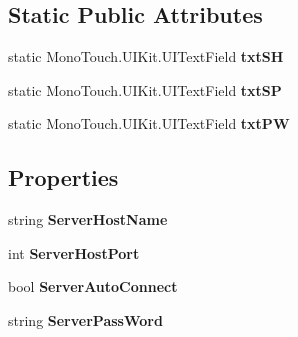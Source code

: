 \subsection*{Static Public Attributes}
\begin{DoxyCompactItemize}
\item 
\hypertarget{class_pro_scan_mobile_1_1vc_options_screen_abb3cdfb902c4799355e64ea23f4c4067}{static Mono\-Touch.\-U\-I\-Kit.\-U\-I\-Text\-Field {\bfseries txt\-S\-H}}\label{class_pro_scan_mobile_1_1vc_options_screen_abb3cdfb902c4799355e64ea23f4c4067}

\item 
\hypertarget{class_pro_scan_mobile_1_1vc_options_screen_a082bba3a700d9e158b3b86add2af8599}{static Mono\-Touch.\-U\-I\-Kit.\-U\-I\-Text\-Field {\bfseries txt\-S\-P}}\label{class_pro_scan_mobile_1_1vc_options_screen_a082bba3a700d9e158b3b86add2af8599}

\item 
\hypertarget{class_pro_scan_mobile_1_1vc_options_screen_ac52f40b845e5aefde7709a6fd14365e5}{static Mono\-Touch.\-U\-I\-Kit.\-U\-I\-Text\-Field {\bfseries txt\-P\-W}}\label{class_pro_scan_mobile_1_1vc_options_screen_ac52f40b845e5aefde7709a6fd14365e5}

\end{DoxyCompactItemize}
\subsection*{Properties}
\begin{DoxyCompactItemize}
\item 
\hypertarget{class_pro_scan_mobile_1_1vc_options_screen_a90132389f95d307c2f6d1e78bbf447d9}{string {\bfseries Server\-Host\-Name}}\label{class_pro_scan_mobile_1_1vc_options_screen_a90132389f95d307c2f6d1e78bbf447d9}

\item 
\hypertarget{class_pro_scan_mobile_1_1vc_options_screen_a0ec549088d412653e3c0fa2b3337fbeb}{int {\bfseries Server\-Host\-Port}}\label{class_pro_scan_mobile_1_1vc_options_screen_a0ec549088d412653e3c0fa2b3337fbeb}

\item 
\hypertarget{class_pro_scan_mobile_1_1vc_options_screen_a9854fdc579de1fb2dd56d575a78b340b}{bool {\bfseries Server\-Auto\-Connect}}\label{class_pro_scan_mobile_1_1vc_options_screen_a9854fdc579de1fb2dd56d575a78b340b}

\item 
\hypertarget{class_pro_scan_mobile_1_1vc_options_screen_aa2759a10f3eff93eea32706a4fd280e5}{string {\bfseries Server\-Pass\-Word}}\label{class_pro_scan_mobile_1_1vc_options_screen_aa2759a10f3eff93eea32706a4fd280e5}

\end{DoxyCompactItemize}


